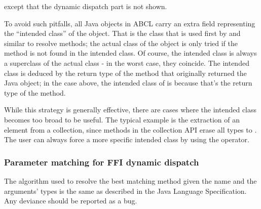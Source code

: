 \documentclass[10pt]{book}
\begin{document}
except that the dynamic dispatch part is not shown.

To avoid such pitfalls, all Java objects in ABCL carry an extra
field representing the ``intended class'' of the object. That is the class
that is used first by  and similar to resolve methods;
the actual class of the object is only tried if the method is not found
in the intended class. Of course, the intended class is always a superclass
of the actual class - in the worst case, they coincide. The intended class
is deduced by the return type of the method that originally returned
the Java object; in the case above, the intended class of 
is  because that's the return type of
the  method.

While this strategy is generally effective, there are cases where the
intended class becomes too broad to be useful. The typical example
is the extraction of an element from a collection, since methods in
the collection API erase all types to . The user can
always force a more specific intended class by using the 
operator.


\subsubsection{Parameter matching for FFI dynamic dispatch}

The algorithm used to resolve the best matching method given the name
and the arguments' types is the same as described in the Java Language
Specification. Any deviance should be reported as a bug.
\end{document}
